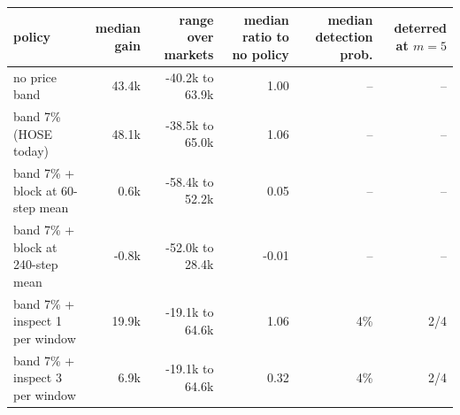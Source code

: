 \begin{tabular}{lrrrrr}
\toprule
policy & median gain & range over markets & median ratio to no policy & median detection prob. & deterred at $m=5$ \\
\midrule
no price band & 43.4k & -40.2k to 63.9k & 1.00 & -- & -- \\
band 7\% (HOSE today) & 48.1k & -38.5k to 65.0k & 1.06 & -- & -- \\
band 7\% + block at 60-step mean & 0.6k & -58.4k to 52.2k & 0.05 & -- & -- \\
band 7\% + block at 240-step mean & -0.8k & -52.0k to 28.4k & -0.01 & -- & -- \\
band 7\% + inspect 1 per window & 19.9k & -19.1k to 64.6k & 1.06 & 4\% & 2/4 \\
band 7\% + inspect 3 per window & 6.9k & -19.1k to 64.6k & 0.32 & 4\% & 2/4 \\
\bottomrule
\end{tabular}
